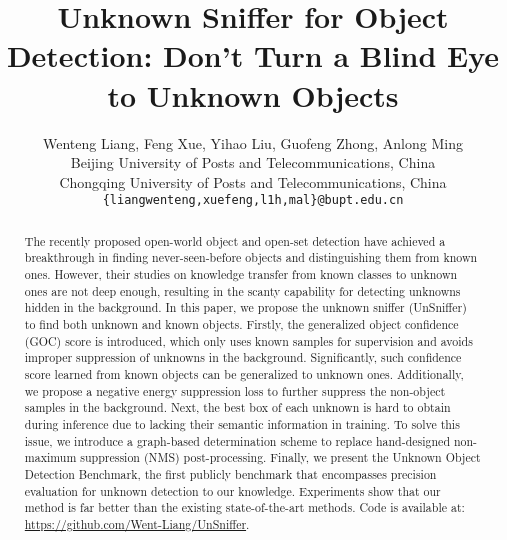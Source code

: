 \documentclass[10pt,twocolumn,letterpaper]{article}
\newcommand{\xf}[1]{{\color{black} #1}}
\begin{document}
\title{Unknown Sniffer for Object Detection: Don't Turn a Blind Eye\\ to Unknown Objects}

\author{Wenteng Liang, Feng Xue, Yihao Liu, Guofeng Zhong, Anlong Ming\\
Beijing University of Posts and Telecommunications, China\\
Chongqing University of Posts and Telecommunications, China\\
{\tt\small \{liangwenteng,xuefeng,l1h,mal\}@bupt.edu.cn}}

\maketitle

\renewcommand{\thefootnote}{\fnsymbol{footnote}}


\begin{abstract}
The recently proposed open-world object and open-set detection \xf{have achieved} a breakthrough in finding never-seen-before objects and distinguishing them from \xf{known ones}.
However, their studies on knowledge transfer from known classes to unknown ones \xf{are not deep enough},
\xf{resulting in} the scanty capability for detecting unknowns hidden in the background.
In this paper, we propose the unknown sniffer (UnSniffer) to find both unknown and known objects.
Firstly, the generalized object confidence (GOC) score is introduced,
which only uses \xf{known} samples for supervision and avoids improper suppression of unknowns in the background.
Significantly, such confidence score learned from \xf{known} objects can be generalized to unknown ones.
Additionally, we propose a negative energy suppression loss to further \xf{suppress} the non-object samples in the background.
Next, the best box of each unknown is hard to obtain during inference due to lacking their semantic information in training.
To solve this issue,
we introduce a graph-based determination scheme to replace hand-designed non-maximum suppression (NMS) post-processing.
Finally, we present the Unknown Object Detection Benchmark,
the first publicly benchmark that encompasses precision evaluation for \xf{unknown detection} to our knowledge.
Experiments show that our method is far better than the existing state-of-the-art methods.
Code is available at: \url{https://github.com/Went-Liang/UnSniffer}.


\end{abstract}
\end{document}
